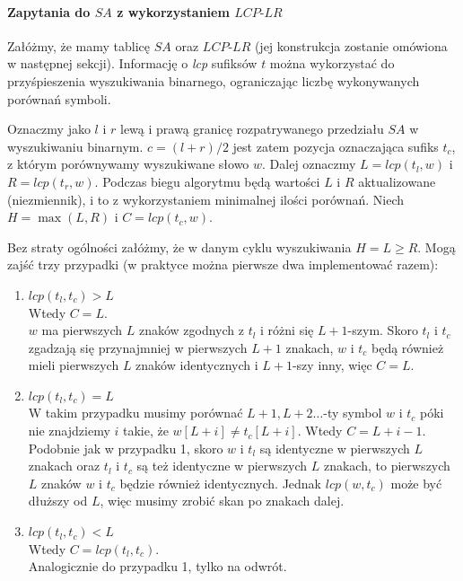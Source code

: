 \paragraph{Zapytania do $SA$ z wykorzystaniem $LCP\textrm{-}LR$}

Załóżmy, że mamy tablicę $SA$ oraz $LCP\textrm{-}LR$ (jej konstrukcja zostanie omówiona w następnej sekcji). Informację o \textit{lcp} sufiksów $t$ można wykorzystać do przyśpieszenia wyszukiwania binarnego, ograniczając liczbę wykonywanych porównań symboli. 

Oznaczmy jako $l$ i $r$ lewą i prawą granicę rozpatrywanego przedziału $SA$ w wyszukiwaniu binarnym. $c = (l + r) / 2 $ jest zatem pozycja oznaczająca sufiks $t_c$, z którym porównywamy wyszukiwane słowo $w$. Dalej oznaczmy $L = lcp(t_l, w)$ i $R = lcp(t_r, w)$. Podczas biegu algorytmu będą wartości $L$ i $R$ aktualizowane (niezmiennik), i to z wykorzystaniem minimalnej ilości porównań. Niech $H = \max (L, R)$ i $C = lcp(t_c, w)$. 

Bez straty ogólności załóżmy, że w danym cyklu wyszukiwania $H = L \geq R$. Mogą zajść trzy przypadki (w praktyce można pierwsze dwa implementować razem):

\begin{enumerate}
    \item $lcp(t_l, t_c) > L$ \\
          Wtedy $C = L$. \\
          $w$ ma pierwszych $L$ znaków zgodnych z $t_l$ i różni się $L+1$-szym. Skoro $t_l$ i $t_c$ zgadzają się przynajmniej w pierwszych $L+1$ znakach, $w$ i $t_c$ będą również mieli pierwszych $L$ znaków identycznych i $L+1$-szy inny, więc $C = L$.
    \item $lcp(t_l, t_c) = L$ \\
          W takim przypadku musimy porównać $L+1, L+2\ldots$-ty symbol $w$ i $t_c$ póki nie znajdziemy $i$ takie, że $w[L+i] \neq t_c[L+i]$. Wtedy $C = L + i - 1$. \\
          Podobnie jak w przypadku 1, skoro $w$ i $t_l$ są identyczne w pierwszych $L$ znakach oraz $t_l$ i $t_c$ są też identyczne w pierwszych $L$ znakach, to pierwszych $L$ znaków $w$ i $t_c$ będzie również identycznych. Jednak $lcp(w, t_c)$ może być dłuższy od $L$, więc musimy zrobić skan po znakach dalej.  
    \item $lcp(t_l, t_c) < L$ \\
          Wtedy $C = lcp(t_l, t_c)$. \\
          Analogicznie do przypadku 1, tylko na odwrót.
          
\end{enumerate}

